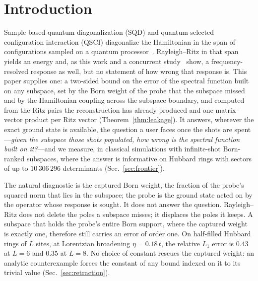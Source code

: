 \section{Introduction}
\label{sec:intro}

Sample-based quantum diagonalization (SQD) and quantum-selected configuration interaction (QSCI)
diagonalize the Hamiltonian in the span of configurations sampled on a quantum
processor~\cite{robledomoreno2025,kanno2023}. Rayleigh--Ritz in that span yields an energy and, as
this work and a concurrent study~\cite{patel2026} show, a frequency-resolved response as well, but
no statement of how wrong that response is. This paper supplies one: a two-sided bound on the error
of the spectral function built on any subspace, set by the Born weight of the probe that the
subspace missed and by the Hamiltonian coupling across the subspace boundary, and computed from the
Ritz pairs the reconstruction has already produced and one matrix--vector product per Ritz vector
(Theorem~\ref{thm:leakage}). It answers, wherever the exact ground state is available, the question
a user faces once the shots are spent---\emph{given the subspace those shots populated, how wrong is
the spectral function built on it?}---and we measure, in classical simulations with infinite-shot
Born-ranked subspaces, where the answer is informative on Hubbard rings with sectors of up to
$10\,306\,296$ determinants (Sec.~\ref{sec:frontier}).

The natural diagnostic is the captured Born weight, the fraction of the probe's squared norm that
lies in the subspace; the probe is the ground state acted on by the operator whose response is
sought. It does not
answer the question. Rayleigh--Ritz does not delete the poles a subspace misses; it displaces the
poles it keeps. A subspace that holds the probe's entire Born support, where the captured weight is
exactly one, therefore still carries an error of order one. On half-filled Hubbard rings of $L$
sites, at Lorentzian broadening $\eta=0.18\,t$, the relative $L_1$ error is $0.43$ at $L=6$ and $0.35$ at $L=8$. No choice of constant rescues the captured
weight: an analytic counterexample forces the constant of any bound indexed on it to its trivial
value (Sec.~\ref{sec:retraction}).

